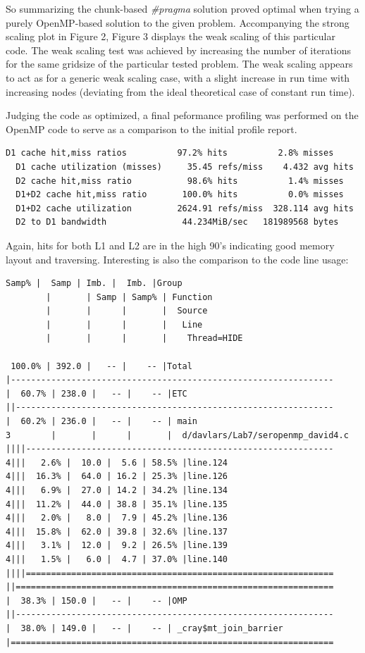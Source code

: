 \documentclass[12pt]{article}
\begin{document}
So summarizing the chunk-based \emph{\color{Plum} \#pragma} solution proved optimal when trying a purely OpenMP-based solution to the given problem. Accompanying the strong scaling plot in Figure 2, Figure 3 displays the weak scaling of this particular code. The weak scaling test was achieved by increasing the number of iterations for the same gridsize of the particular tested problem. The weak scaling appears to act as for a generic weak scaling case, with a slight increase in run time with increasing nodes (deviating from the ideal theoretical case of constant run time). 

Judging the code as optimized, a final peformance profiling was performed on the OpenMP code to serve as a comparison to the initial profile report. 

\begin{lstlisting}[caption=CrayPat/X report snippet, label={lst:L6}]
  D1 cache hit,miss ratios          97.2% hits          2.8% misses
  D1 cache utilization (misses)     35.45 refs/miss    4.432 avg hits
  D2 cache hit,miss ratio           98.6% hits          1.4% misses
  D1+D2 cache hit,miss ratio       100.0% hits          0.0% misses
  D1+D2 cache utilization         2624.91 refs/miss  328.114 avg hits
  D2 to D1 bandwidth               44.234MiB/sec   181989568 bytes
\end{lstlisting}

Again, hits for both L1 and L2 are in the high 90's indicating good memory layout and traversing. Interesting is also the comparison to the code line usage:
\begin{lstlisting}[caption=CrayPat/X report snippet, label={lst:L6}]
  Samp% |  Samp | Imb. |  Imb. |Group
        |       | Samp | Samp% | Function
        |       |      |       |  Source
        |       |      |       |   Line
        |       |      |       |    Thread=HIDE
       
 100.0% | 392.0 |   -- |    -- |Total
|----------------------------------------------------------------
|  60.7% | 238.0 |   -- |    -- |ETC
||---------------------------------------------------------------
|  60.2% | 236.0 |   -- |    -- | main
3        |       |      |       |  d/davlars/Lab7/seropenmp_david4.c
||||-------------------------------------------------------------
4|||   2.6% |  10.0 |  5.6 | 58.5% |line.124
4|||  16.3% |  64.0 | 16.2 | 25.3% |line.126
4|||   6.9% |  27.0 | 14.2 | 34.2% |line.134
4|||  11.2% |  44.0 | 38.8 | 35.1% |line.135
4|||   2.0% |   8.0 |  7.9 | 45.2% |line.136
4|||  15.8% |  62.0 | 39.8 | 32.6% |line.137
4|||   3.1% |  12.0 |  9.2 | 26.5% |line.139
4|||   1.5% |   6.0 |  4.7 | 37.0% |line.140
||||=============================================================
||===============================================================
|  38.3% | 150.0 |   -- |    -- |OMP
||---------------------------------------------------------------
|  38.0% | 149.0 |   -- |    -- | _cray$mt_join_barrier
|================================================================
\end{lstlisting}
\end{document}
